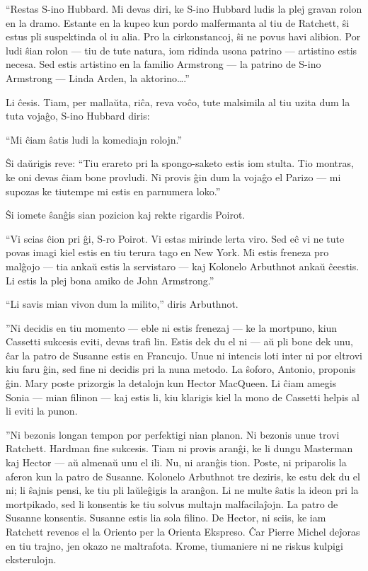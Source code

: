 ``Restas S-ino Hubbard. Mi devas diri, ke S-ino Hubbard ludis la plej gravan rolon en la dramo. Estante en la kupeo kun pordo malfermanta al tiu de Ratchett, ŝi estus pli suspektinda ol iu alia. Pro la cirkonstancoj, ŝi ne povus havi alibion. Por ludi ŝian rolon --- tiu de tute natura, iom ridinda usona patrino --- artistino estis necesa. Sed estis artistino en la familio Armstrong --- la patrino de S-ino Armstrong --- Linda Arden, la aktorino{\ldots}.''

Li ĉesis. Tiam, per mallaŭta, riĉa, reva voĉo, tute malsimila al tiu uzita dum la tuta vojaĝo, S-ino Hubbard diris:

``Mi ĉiam ŝatis ludi la komediajn rolojn.''

Ŝi daŭrigis reve: ``Tiu erareto pri la spongo-saketo estis iom stulta. Tio montras, ke oni devas ĉiam bone provludi. Ni provis ĝin dum la vojaĝo el Parizo --- mi supozas ke tiutempe mi estis en parnumera loko.''

Ŝi iomete ŝanĝis sian pozicion kaj rekte rigardis Poirot.

``Vi scias ĉion pri ĝi, S-ro Poirot. Vi estas mirinde lerta viro. Sed eĉ vi ne tute povas imagi kiel estis en tiu terura tago en New York. Mi estis freneza pro malĝojo --- tia ankaŭ estis la servistaro --- kaj Kolonelo Arbuthnot ankaŭ ĉeestis. Li estis la plej bona amiko de John Armstrong.''

``Li savis mian vivon dum la milito,'' diris Arbuthnot.

''Ni decidis en tiu momento --- eble ni estis frenezaj --- ke la mortpuno, kiun Cassetti sukcesis eviti, devas trafi lin. Estis dek du el ni --- aŭ pli bone dek unu, ĉar la patro de Susanne estis en Francujo. Unue ni intencis loti inter ni por eltrovi kiu faru ĝin, sed fine ni decidis pri la nuna metodo. La ŝoforo, Antonio, proponis ĝin. Mary poste prizorgis la detalojn kun Hector MacQueen. Li ĉiam amegis Sonia --- mian filinon --- kaj estis li, kiu klarigis kiel la mono de Cassetti helpis al li eviti la punon.

''Ni bezonis longan tempon por perfektigi nian planon. Ni bezonis unue trovi Ratchett. Hardman fine sukcesis. Tiam ni provis aranĝi, ke li dungu Masterman kaj Hector --- aŭ almenaŭ unu el ili. Nu, ni aranĝis tion. Poste, ni priparolis la aferon kun la patro de Susanne. Kolonelo Arbuthnot tre deziris, ke estu dek du el ni; li ŝajnis pensi, ke tiu pli laŭleĝigis la aranĝon. Li ne multe ŝatis la ideon pri la mortpikado, sed li konsentis ke tiu solvus multajn malfacilaĵojn. La patro de Susanne konsentis. Susanne estis lia sola filino. De Hector, ni sciis, ke iam Ratchett revenos el la Oriento per la Orienta Ekspreso. Ĉar Pierre Michel deĵoras en tiu trajno, jen okazo ne maltrafota. Krome, tiumaniere ni ne riskus kulpigi eksterulojn.

